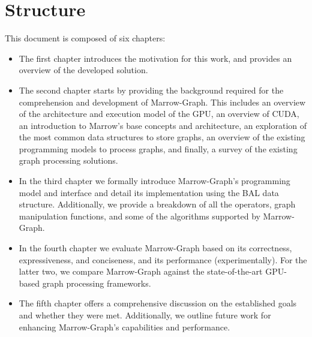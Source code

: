 \section{Structure}

This document is composed of six chapters:

\begin{itemize}
    \item The first chapter introduces the motivation for this work, and provides an overview of the developed solution.
    \item The second chapter starts by providing the background required for the comprehension and development of Marrow-Graph. This includes an overview of the architecture and execution model of the \gls{GPU}, an overview of \gls{CUDA}, an introduction to Marrow's base concepts and architecture, an exploration of the most common data structures to store graphs, an overview of the existing programming models to process graphs, and finally, a survey of the existing graph processing solutions.
    \item In the third chapter we formally introduce Marrow-Graph's programming model and interface and detail its implementation using the \gls{BAL} data structure. Additionally, we provide a breakdown of all the operators, graph manipulation functions, and some of the algorithms supported by Marrow-Graph.
    \item In the fourth chapter we evaluate Marrow-Graph based on its correctness, expressiveness, and conciseness, and its performance (experimentally). For the latter two, we compare Marrow-Graph against the state-of-the-art \gls{GPU}-based graph processing frameworks.
    \item The fifth chapter offers a comprehensive discussion on the established goals and whether they were met. Additionally, we outline future work for enhancing Marrow-Graph's capabilities and performance.
\end{itemize}
